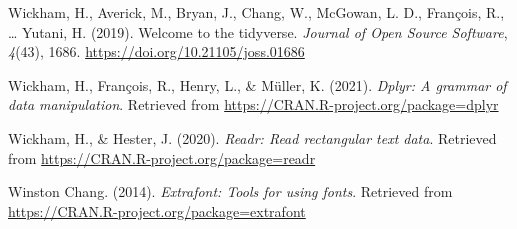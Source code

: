 \documentclass[
  english,
  man,floatsintext]{apa6}
\begin{document}
\leavevmode\hypertarget{ref-R-tidyverse}{}%
Wickham, H., Averick, M., Bryan, J., Chang, W., McGowan, L. D., François, R., \ldots{} Yutani, H. (2019). Welcome to the tidyverse. \emph{Journal of Open Source Software}, \emph{4}(43), 1686. \url{https://doi.org/10.21105/joss.01686}

\leavevmode\hypertarget{ref-R-dplyr}{}%
Wickham, H., François, R., Henry, L., \& Müller, K. (2021). \emph{Dplyr: A grammar of data manipulation}. Retrieved from \url{https://CRAN.R-project.org/package=dplyr}

\leavevmode\hypertarget{ref-R-readr}{}%
Wickham, H., \& Hester, J. (2020). \emph{Readr: Read rectangular text data}. Retrieved from \url{https://CRAN.R-project.org/package=readr}

\leavevmode\hypertarget{ref-R-extrafont}{}%
Winston Chang. (2014). \emph{Extrafont: Tools for using fonts}. Retrieved from \url{https://CRAN.R-project.org/package=extrafont}

\endgroup
\end{document}

